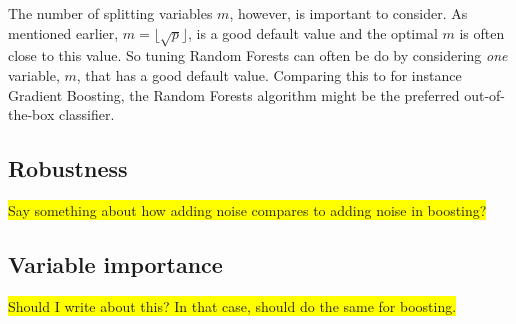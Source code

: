 The number of splitting variables $m$, however, is  important to consider. As mentioned earlier, $m = \lfloor \sqrt{p} \rfloor$, is a good default value and the optimal $m$ is often close to this value. 
So tuning Random Forests can often be do by considering \textit{one} variable, $m$, that has a good default value. Comparing this to for instance Gradient Boosting, the Random Forests algorithm might be the preferred out-of-the-box classifier. 


\subsection{Robustness}
\label{sub:Robustness}
\colorbox{yellow}{Say something about how adding noise compares to adding noise in boosting?}

\subsection{Variable importance}
\label{sub:Variable importance}
\colorbox{yellow}{Should I write about this? In that case, should do the same for boosting.}

